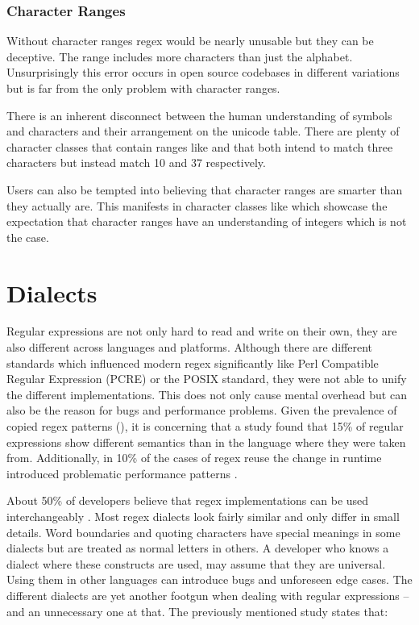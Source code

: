 \subsubsection{Character Ranges}

Without character ranges regex would be nearly unusable but they can be deceptive. The range \pattern{[A-z]} includes more characters than just the alphabet. Unsurprisingly this error occurs in open source codebases in different variations \cite{RegexErrorCamelLetterRange}\cite{RegexErrorApacheGeodeLetterRange}\cite{RegexErrorElasticSearchLetterRange} but is far from the only problem with character ranges.

There is an inherent disconnect between the human understanding of symbols and characters and their arrangement on the unicode table. There are plenty of character classes that contain ranges like \pattern{[\%-.]} \cite{RegexErrorJenkinsSpecialRange} and \pattern{[;-\_]} \cite{RegexErrorQuizconnectSpecialRange} that both intend to match three characters but instead match 10 and 37 respectively.

Users can also be tempted into believing that character ranges are smarter than they actually are. This manifests in character classes like \pattern{[0-31]} \cite{RegexErrorHadoopNumberRange} which showcase the expectation that character ranges have an understanding of integers which is not the case.

\section{Dialects}

Regular expressions are not only hard to read and write on their own, they are also different across languages and platforms. Although there are different standards which influenced modern regex significantly like Perl Compatible Regular Expression (PCRE) or the POSIX standard, they were not able to unify the different implementations. This does not only cause mental overhead but can also be the reason for bugs and performance problems. Given the prevalence of copied regex patterns (), it is concerning that a study found that 15\% of regular expressions show different semantics than in the language where they were taken from. Additionally, in 10\% of the cases of regex reuse the change in runtime introduced problematic performance patterns \cite{RegexNotLinguaFranca}.

About 50\% of developers believe that regex implementations can be used interchangeably \cite{RegexNotLinguaFranca}. Most regex dialects look fairly similar and only differ in small details. Word boundaries  and quoting characters  have special meanings in some dialects but are treated as normal letters in others. A developer who knows a dialect where these constructs are used, may assume that they are universal. Using them in other languages can introduce bugs and unforeseen edge cases. The different dialects are yet another footgun when dealing with regular expressions -- and an unnecessary one at that. The previously mentioned study \cite{RegexNotLinguaFranca} states that:

